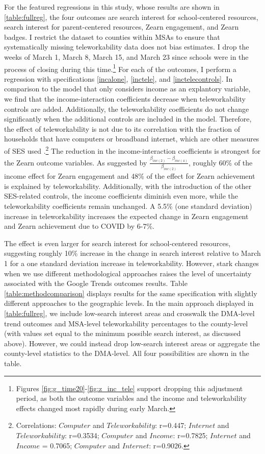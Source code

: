 	For the featured regressions in this study, whose results are shown in \ref{table:fullreg}, the four outcomes are search interest for school-centered resources, search interest for parent-centered resources, Zearn engagement, and Zearn badges. I restrict the dataset to counties within MSAs to ensure that systematically missing teleworkability data does not bias estimates. I drop the weeks of March 1, March 8, March 15, and March 23 since schools were in the process of closing during this time.\footnote{Figures \ref{fig:g_time20}-\ref{fig:z_inc_tele} support dropping this adjustment period, as both the outcome variables and the income and teleworkability effects changed most rapidly during early March.} For each of the outcomes, I perform a regression with specifications \ref{incalone}, \ref{inctele}, and \ref{inctelecontrols}. In comparison to the model that only considers income as an explantory variable, we find that the income-interaction coefficients decrease when teleworkability controls are added. Additionally, the teleworkability coefficients do not change significantly when the additional controls are included in the model. Therefore, the effect of teleworkability is not due to its correlation with the fraction of households that have computers or broadband internet, which are other measures of SES used \cite{bh1}.\footnote{Correlations: $Computer$ and $Teleworkability$: r=0.447; $Internet$ and $Teleworkability$: r=0.3534; $Computer$ and $Income$: r=0.7825; $Internet$ and $Income$ = 0.7065; $Computer$ and $Internet$: r=0.9026.}
	The reduction in the income-interaction coefficients is strongest for the Zearn outcome variables. As suggested by $\frac{\beta_{inc\left(2\right)}-\beta_{inc\left(4\right)}}{\beta_{inc\left(2\right)}}$, roughly 60\% of the income effect for Zearn engagement and 48\% of the effect for Zearn achievement is explained by teleworkability.  Additionally, with the introduction of the other SES-related controls, the income coefficients diminish even more, while the teleworkability coefficients remain unchanged. A 5.5\% (one standard deviation) increase in teleworkability increases the expected change in Zearn engagement and Zearn achievement due to COVID by 6-7\%.  \par
	The effect is even larger for search interest for school-centered resources, suggesting roughly 10\% increase in the change in search interest relative to March 1 for a one standard deviation increase in teleworkability. However, stark changes when we use different methodological approaches raises the level of uncertainty associated with the Google Trends outcomes results. Table \ref{table:methodcomparison} displays results for the same specification with slightly different approaches to the geographic levels. In the main approach displayed in \ref{table:fullreg}, we include low-search interest areas and crosswalk the DMA-level trend outcomes and MSA-level teleworkability percentages to the county-level (with values set equal to the minimum possible search interest, as discussed above). However, we could instead drop low-search interest areas or aggregate the county-level statistics to the DMA-level. All four possibilities are shown in the table. \par

